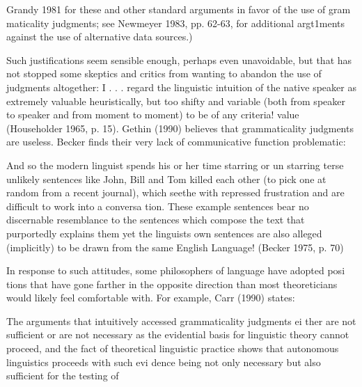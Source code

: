 \begin{styleStandard}
Grandy 1981 for these and other standard arguments in favor of the use of gram\- maticality judgments; see Newmeyer 1983, pp. 62-63, for additional argt1ments against the use of alternative data sources.)
\end{styleStandard}


\begin{styleStandard}
Such justifications seem sensible enough, perhaps even unavoidable, but that has not stopped some skeptics and critics from wanting to abandon the use of judgments altogether: {\textquotedbl}I . . . regard the {\textquotesingle}linguistic intuition of the native speaker{\textquotesingle} as extremely valuable heuristically, but too shifty and variable (both from speaker to speaker and from moment to moment) to be of any criteria! value{\textquotedbl} (Householder 1965, p. 15). Gethin (1990) believes that grammaticality judgments are useless. Becker finds their very lack of communicative function problematic:
\end{styleStandard}


\begin{styleStandard}
And so the {\textquotedbl}modern{\textquotedbl} linguist spends his or her time starring or un\- starring terse unlikely sentences like {\textquotedbl}John, Bill and Tom killed each other{\textquotedbl} (to pick one at random from a recent journal), which seethe with repressed frustration and are difficult to work into a conversa\- tion. These example sentences bear no discernable resemblance to the sentences which compose the text that purportedly explains them\- yet the linguist{\textquotesingle}s own sentences are also alleged (implicitly) to be drawn from the same English Language! (Becker 1975, p. 70)
\end{styleStandard}


\begin{styleStandard}
In response to such attitudes, some philosophers of language have adopted posi\- tions that have gone farther in the opposite direction than most theoreticians would likely feel comfortable with. For example, Carr (1990) states:
\end{styleStandard}


\begin{styleStandard}
The arguments that intuitively accessed grammaticality judgments ei\- ther are not sufficient or are not necessary as the evidential basis for linguistic theory cannot proceed, and the fact of theoretical linguistic practice shows that autonomous linguistics proceeds with such evi\- dence being not only necessary but also sufficient for the testing of
\end{styleStandard}


